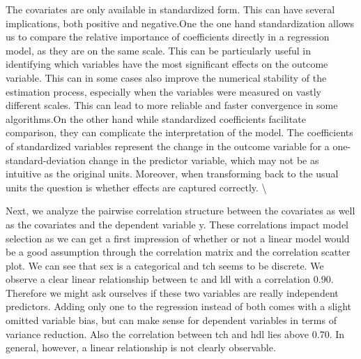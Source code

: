 \documentclass[
]{article}
\begin{document}
The covariates are only available in standardized form. This can have
several implications, both positive and negative.One the one hand
standardization allows us to compare the relative importance of
coefficients directly in a regression model, as they are on the same
scale. This can be particularly useful in identifying which variables
have the most significant effects on the outcome variable. This can in
some cases also improve the numerical stability of the estimation
process, especially when the variables were measured on vastly different
scales. This can lead to more reliable and faster convergence in some
algorithms.On the other hand while standardized coefficients facilitate
comparison, they can complicate the interpretation of the model. The
coefficients of standardized variables represent the change in the
outcome variable for a one-standard-deviation change in the predictor
variable, which may not be as intuitive as the original units. Moreover,
when transforming back to the usual units the question is whether
effects are captured correctly. \textbackslash{}

Next, we analyze the pairwise correlation structure between the
covariates as well as the covariates and the dependent variable y. These
correlations impact model selection as we can get a first impression of
whether or not a linear model would be a good assumption through the
correlation matrix and the correlation scatter plot. We can see that sex
is a categorical and tch seems to be discrete. We observe a clear linear
relationship between tc and ldl with a correlation 0.90. Therefore we
might ask ourselves if these two variables are really independent
predictors. Adding only one to the regression instead of both comes with
a slight omitted variable bias, but can make sense for dependent
variables in terms of variance reduction. Also the correlation between
tch and hdl lies above 0.70. In general, however, a linear relationship
is not clearly observable.
\end{document}
